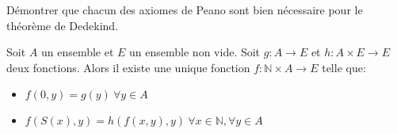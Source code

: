 \begin{exercice}
	Démontrer que chacun des axiomes de Peano sont bien nécessaire pour le théorème de Dedekind.
\end{exercice}



\begin{coro}
	Soit $A$ un ensemble et $E$ un ensemble non vide. Soit $g: A \to E$ et $h: A \times E \to E$ deux fonctions. Alors il existe une unique fonction $f: \mathbb{N} \times A \to E$ telle que:
	\begin{itemize}
		\item $f(0,y) = g(y) \ \forall y \in A$
		\item $f(S(x), y) = h(f(x,y), y) \ \forall x \in \mathbb{N}, \forall y \in A$
	\end{itemize}
\end{coro}



